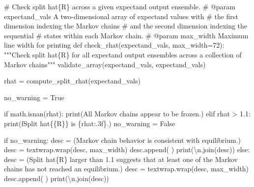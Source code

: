 \documentclass[
  letterpaper,
  DIV=11,
  numbers=noendperiod]{scrartcl}
\newenvironment{Shaded}{\begin{snugshade}}{\end{snugshade}}
\newcommand{\BuiltInTok}[1]{\textcolor[rgb]{0.00,0.23,0.31}{#1}}
\newcommand{\CharTok}[1]{\textcolor[rgb]{0.13,0.47,0.30}{#1}}
\newcommand{\CommentTok}[1]{\textcolor[rgb]{0.37,0.37,0.37}{#1}}
\newcommand{\ControlFlowTok}[1]{\textcolor[rgb]{0.00,0.23,0.31}{#1}}
\newcommand{\DecValTok}[1]{\textcolor[rgb]{0.68,0.00,0.00}{#1}}
\newcommand{\FloatTok}[1]{\textcolor[rgb]{0.68,0.00,0.00}{#1}}
\newcommand{\KeywordTok}[1]{\textcolor[rgb]{0.00,0.23,0.31}{#1}}
\newcommand{\NormalTok}[1]{\textcolor[rgb]{0.00,0.23,0.31}{#1}}
\newcommand{\OperatorTok}[1]{\textcolor[rgb]{0.37,0.37,0.37}{#1}}
\newcommand{\SpecialCharTok}[1]{\textcolor[rgb]{0.37,0.37,0.37}{#1}}
\newcommand{\SpecialStringTok}[1]{\textcolor[rgb]{0.13,0.47,0.30}{#1}}
\newcommand{\StringTok}[1]{\textcolor[rgb]{0.13,0.47,0.30}{#1}}
\newcommand{\VariableTok}[1]{\textcolor[rgb]{0.07,0.07,0.07}{#1}}
\begin{document}
\begin{Shaded}
\begin{Highlighting}[]
\CommentTok{\# Check split hat\{R\} across a given expectand output ensemble.}
\CommentTok{\# @param expectand\_vals A two{-}dimensional array of expectand values with}
\CommentTok{\#                       the first dimension indexing the Markov chains}
\CommentTok{\#                       and the second dimension indexing the sequential}
\CommentTok{\#                       states within each Markov chain.}
\CommentTok{\# @param max\_width Maximum line width for printing}
\KeywordTok{def}\NormalTok{ check\_rhat(expectand\_vals, max\_width}\OperatorTok{=}\DecValTok{72}\NormalTok{):}
  \CommentTok{"""Check split hat\{R\} for all expectand output ensembles across}
\CommentTok{     a collection of Markov chains"""}
\NormalTok{  validate\_array(expectand\_vals, }\StringTok{\textquotesingle{}expectand\_vals\textquotesingle{}}\NormalTok{)}
    
\NormalTok{  rhat }\OperatorTok{=}\NormalTok{ compute\_split\_rhat(expectand\_vals)}

\NormalTok{  no\_warning }\OperatorTok{=} \VariableTok{True}
  
  \ControlFlowTok{if}\NormalTok{ math.isnan(rhat):}
    \BuiltInTok{print}\NormalTok{(}\StringTok{\textquotesingle{}All Markov chains appear to be frozen.\textquotesingle{}}\NormalTok{)}
  \ControlFlowTok{elif}\NormalTok{ rhat }\OperatorTok{\textgreater{}} \FloatTok{1.1}\NormalTok{:}
    \BuiltInTok{print}\NormalTok{(}\SpecialStringTok{f\textquotesingle{}Split hat}\CharTok{\{\{}\SpecialStringTok{R}\CharTok{\}\}}\SpecialStringTok{ is }\SpecialCharTok{\{}\NormalTok{rhat}\SpecialCharTok{:.3f\}}\SpecialStringTok{.\textquotesingle{}}\NormalTok{)}
\NormalTok{    no\_warning }\OperatorTok{=} \VariableTok{False}

  \ControlFlowTok{if}\NormalTok{ no\_warning:}
\NormalTok{    desc }\OperatorTok{=}\NormalTok{ (}\StringTok{\textquotesingle{}Markov chain behavior is consistent with equilibrium.\textquotesingle{}}\NormalTok{)}
\NormalTok{    desc }\OperatorTok{=}\NormalTok{ textwrap.wrap(desc, max\_width)}
\NormalTok{    desc.append(}\StringTok{\textquotesingle{} \textquotesingle{}}\NormalTok{)}
    \BuiltInTok{print}\NormalTok{(}\StringTok{\textquotesingle{}}\CharTok{\textbackslash{}n}\StringTok{\textquotesingle{}}\NormalTok{.join(desc))}
  \ControlFlowTok{else}\NormalTok{:}
\NormalTok{    desc }\OperatorTok{=}\NormalTok{ (}\StringTok{\textquotesingle{}Split hat}\SpecialCharTok{\{R\}}\StringTok{ larger than 1.1 suggests that at least one \textquotesingle{}}
            \StringTok{\textquotesingle{}of the Markov chains has not reached an equilibrium.\textquotesingle{}}\NormalTok{)}
\NormalTok{    desc }\OperatorTok{=}\NormalTok{ textwrap.wrap(desc, max\_width)}
\NormalTok{    desc.append(}\StringTok{\textquotesingle{} \textquotesingle{}}\NormalTok{)}
    \BuiltInTok{print}\NormalTok{(}\StringTok{\textquotesingle{}}\CharTok{\textbackslash{}n}\StringTok{\textquotesingle{}}\NormalTok{.join(desc))}
\end{Highlighting}
\end{Shaded}
\end{document}
